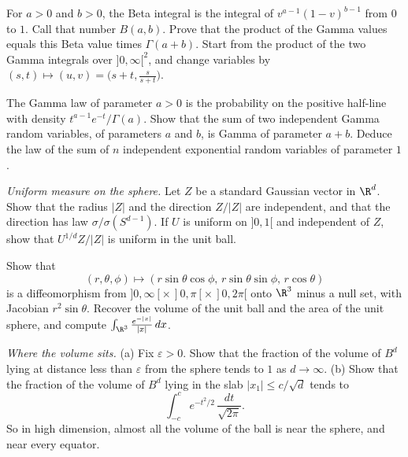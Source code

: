 \begin{exercise}[$\star\star$]\label{ex:betagamma}
For $a>0$ and $b>0$, the Beta integral is the integral of $v^{a-1}(1-v)^{b-1}$ from $0$ to $1$. Call that number $B(a,b)$. Prove that the product of the Gamma values equals this Beta value times $\Gamma(a+b)$. Start from the product of the two Gamma integrals over $]0,\infty[^2$, and change variables by $(s,t)\mapsto(u,v)=\bigl(s+t,\frac{s}{s+t}\bigr)$.
\end{exercise}

\begin{exercise}[$\star$]\label{ex:gammasum}
The Gamma law of parameter $a>0$ is the probability on the positive half-line with density $t^{a-1}e^{-t}/\Gamma(a)$. Show that the sum of two independent Gamma random variables, of parameters $a$ and $b$, is Gamma of parameter $a+b$. Deduce the law of the sum of $n$ independent exponential random variables of parameter $1$.
\end{exercise}

\begin{exercise}[$\star\star$]\label{ex:sphere}
\emph{Uniform measure on the sphere.} Let $Z$ be a standard Gaussian vector in $\R^d$. Show that the radius $|Z|$ and the direction $Z/|Z|$ are independent, and that the direction has law $\sigma/\sigma(S^{d-1})$. If $U$ is uniform on $]0,1[$ and independent of $Z$, show that $U^{1/d}Z/|Z|$ is uniform in the unit ball.
\end{exercise}

\begin{exercise}[$\star$]\label{ex:spherical3}
Show that
\[
(r,\theta,\phi)\mapsto(r\sin\theta\cos\phi,\,r\sin\theta\sin\phi,\,r\cos\theta)
\]
is a diffeomorphism from $]0,\infty[\times\,]0,\pi[\times\,]0,2\pi[$ onto $\R^3$ minus a null set, with Jacobian $r^2\sin\theta$. Recover the volume of the unit ball and the area of the unit sphere, and compute $\int_{\R^3}\frac{e^{-|x|}}{|x|}\,dx$.
\end{exercise}

\begin{exercise}[$\star\star$]\label{ex:shell}
\emph{Where the volume sits.} (a) Fix $\varepsilon>0$. Show that the fraction of the volume of $B^d$ lying at distance less than $\varepsilon$ from the sphere tends to $1$ as $d\to\infty$. (b) Show that the fraction of the volume of $B^d$ lying in the slab $|x_1|\le c/\sqrt d$ tends to
\[
\int_{-c}^{c}e^{-t^2/2}\,\frac{dt}{\sqrt{2\pi}}.
\]
So in high dimension, almost all the volume of the ball is near the sphere, and near every equator.
\end{exercise}

